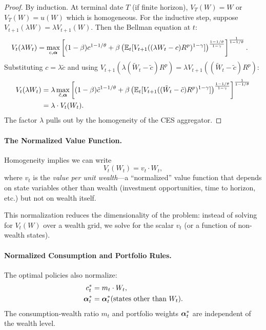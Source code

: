 \begin{proof}
By induction. At terminal date $T$ (if finite horizon), $V_T(W) = W$ or $V_T(W) = u(W)$ which is homogeneous. For the inductive step, suppose $V_{t+1}(\lambda W) = \lambda V_{t+1}(W)$. Then the Bellman equation at $t$:
\begin{align*}
V_t(\lambda W_t) &= \max_{c, \boldsymbol{\alpha}} \left[ (1-\beta) c^{1-1/\theta} + \beta \left( \mathbb{E}_t[V_{t+1}((\lambda W_t - c) R^p)^{1-\gamma}] \right)^{\frac{1-1/\theta}{1-\gamma}} \right]^{\frac{1}{1-1/\theta}}.
\end{align*}
Substituting $c = \lambda \tilde{c}$ and using $V_{t+1}(\lambda(\tilde{W}_t - \tilde{c}) R^p) = \lambda V_{t+1}((\tilde{W}_t - \tilde{c}) R^p)$:
\begin{align*}
V_t(\lambda W_t) &= \lambda \max_{\tilde{c}, \boldsymbol{\alpha}} \left[ (1-\beta) \tilde{c}^{1-1/\theta} + \beta \left( \mathbb{E}_t[V_{t+1}((\tilde{W}_t - \tilde{c}) R^p)^{1-\gamma}] \right)^{\frac{1-1/\theta}{1-\gamma}} \right]^{\frac{1}{1-1/\theta}} \\
&= \lambda \cdot V_t(W_t).
\end{align*}
The factor $\lambda$ pulls out by the homogeneity of the CES aggregator.
\end{proof}

\paragraph{The Normalized Value Function.}

Homogeneity implies we can write
\begin{equation}
V_t(W_t) = v_t \cdot W_t,
\label{eq:normalized-value}
\end{equation}
where $v_t$ is the \emph{value per unit wealth}---a ``normalized'' value function that depends on state variables other than wealth (investment opportunities, time to horizon, etc.) but not on wealth itself.

This normalization reduces the dimensionality of the problem: instead of solving for $V_t(W)$ over a wealth grid, we solve for the scalar $v_t$ (or a function of non-wealth states).

\paragraph{Normalized Consumption and Portfolio Rules.}

The optimal policies also normalize:
\begin{align}
c_t^{*} &= m_t \cdot W_t, \label{eq:normalized-consumption} \\
\boldsymbol{\alpha}_t^{*} &= \boldsymbol{\alpha}_t^{*}(\text{states other than } W_t). \label{eq:normalized-portfolio}
\end{align}
The consumption-wealth ratio $m_t$ and portfolio weights $\boldsymbol{\alpha}_t^{*}$ are independent of the wealth level.


